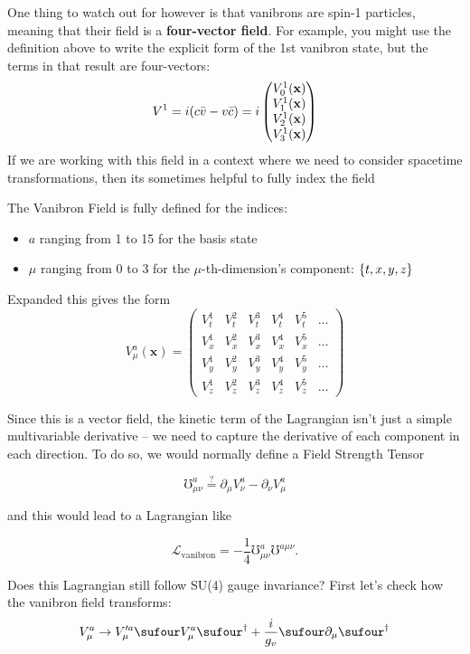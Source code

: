 One thing to watch out for however is that vanibrons are spin-1 particles, meaning that their field is a \textbf{four-vector field}. For example, you might use the definition above to write the explicit form of the 1st vanibron state, but the terms in that result are four-vectors:
\[
  V^1 = i(c\bar{v}-v\bar{c}) = i\fourvec{%
    V^1_0(\mathbf{x})%
  }{
    V^1_1(\mathbf{x})
  }{
    V^1_2(\mathbf{x})
  }{
    V^1_3(\mathbf{x})
  }
\]
If we are working with this field in a context where we need to consider spacetime transformations, then its sometimes helpful to fully index the field
\begin{definition}
  The Vanibron Field is fully defined for the indices:
  \begin{itemize}
    \item \(a\) ranging from 1 to 15 for the basis state
    \item \(\mu\) ranging from 0 to 3 for the \(\mu\)-th-dimension's component: \(\left\{t, x, y, z\right\}\)
  \end{itemize}
  Expanded this gives the form
  \[
    V^a_{\mu}(\mathbf{x}) =
    \begin{pmatrix}
      V_t^1 & V_t^2 & V_t^3 & V_t^4 & V_t^5 & \ldots \\
      V_x^1 & V_x^2 & V_x^3 & V_x^4 & V_x^5 & \ldots \\
      V_y^1 & V_y^2 & V_y^3 & V_y^4 & V_y^5 & \ldots \\
      V_z^1 & V_z^2 & V_z^3 & V_z^4 & V_z^5 & \ldots
    \end{pmatrix}
  \]
\end{definition}


Since this is a vector field, the kinetic term of the Lagrangian isn't just a simple multivariable derivative -- we need to capture the derivative of each component in each direction. To do so, we would normally define a Field Strength Tensor

\[\mho^a_{\mu \nu} \overset{?}{=} \partial_{\mu}V^a_{\nu} - \partial_{\nu}V^a_{\mu}\]

and this would lead to a Lagrangian like

\[
  \mathcal{L}_{\text{vanibron}} = -\frac{1}{4} \mho^a_{\mu \nu} \mho^{a \mu \nu}.
\]

Does this Lagrangian still follow SU(4) gauge invariance? First let's check how the vanibron field transforms:
\[
  V^a_{\mu} \rightarrow V^{\prime a}_{\mu} \sufour V^a_{\mu} \sufour^{\dag} + \frac{i}{g_v} \sufour \partial_{\mu} \sufour^{\dag}
\]

